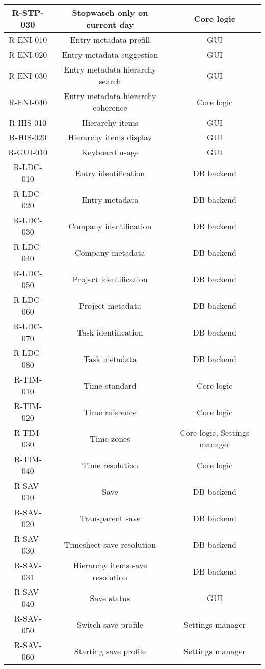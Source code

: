 \begin{longtable}{| c | c | c |}
  R-STP-030 & Stopwatch only on current day & Core logic \\ \hline
  R-ENI-010 & Entry metadata prefill & GUI \\ \hline
  R-ENI-020 & Entry metadata suggestion & GUI \\ \hline
  R-ENI-030 & Entry metadata hierarchy search & GUI \\ \hline
  R-ENI-040 & Entry metadata hierarchy coherence & Core logic \\ \hline
  R-HIS-010 & Hierarchy items & GUI \\ \hline
  R-HIS-020 & Hierarchy items display & GUI \\ \hline
  R-GUI-010 & Keyboard usage & GUI \\ \hline
  R-LDC-010 & Entry identification & DB backend \\ \hline
  R-LDC-020 & Entry metadata & DB backend \\ \hline
  R-LDC-030 & Company identification & DB backend \\ \hline
  R-LDC-040 & Company metadata & DB backend \\ \hline
  R-LDC-050 & Project identification & DB backend \\ \hline
  R-LDC-060 & Project metadata & DB backend \\ \hline
  R-LDC-070 & Task identification & DB backend \\ \hline
  R-LDC-080 & Task metadata & DB backend \\ \hline
  R-TIM-010 & Time standard & Core logic \\ \hline
  R-TIM-020 & Time reference & Core logic \\ \hline
  R-TIM-030 & Time zones & Core logic, Settings manager \\ \hline
  R-TIM-040 & Time resolution & Core logic \\ \hline
  R-SAV-010 & Save & DB backend \\ \hline
  R-SAV-020 & Transparent save & DB backend \\ \hline
  R-SAV-030 & Timesheet save resolution & DB backend \\ \hline
  R-SAV-031 & Hierarchy items save resolution & DB backend \\ \hline
  R-SAV-040 & Save status & GUI \\ \hline
  R-SAV-050 & Switch save profile & Settings manager \\ \hline
  R-SAV-060 & Starting save profile & Settings manager \\ \hline

\end{longtable}
